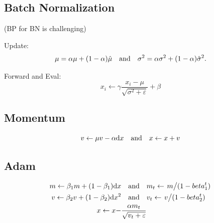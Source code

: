 \documentclass[a4paper,landscape]{article}
\begin{document}
\begin{tiny}
\begin{multicols}{4}
\begin{md}
			\subsection{Batch Normalization} (BP for BN is challenging)

			Update:
			\[
				\mu = \alpha\mu + (1-\alpha)\hat{\mu}
				\qand
				\sigma^2 = \alpha\sigma^2 + (1-\alpha)\hat{\sigma}^2
				.\]

			Forward and Eval:
			\[
				x_i\gets \gamma \frac{x_i-\mu}{\sqrt{\sigma^2+\varepsilon}}+\beta
			\]

			\subsection{Momentum}
			\[
				v\gets\mu v-\alpha\dd x \qand x\gets x+v
			\]

			\subsection{Adam}
			\[
				\begin{aligned}
					m\gets\beta_1 m+(1-\beta_1)\dd x
					           & \qand
					m_t \gets \flatfrac{m}{(1-beta_1^t)}
					\\
					v\gets\beta_2 v+(1-\beta_2)\dd x^2
					           & \qand
					v_t \gets \flatfrac{v}{(1-beta_2^t)}
					\\
					x \gets x- & \frac{\alpha m_t}{\sqrt{v_t+\varepsilon}}
				\end{aligned}
			\]
		\end{md}
	\end{multicols}
\end{tiny}
\end{document}
